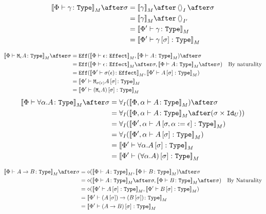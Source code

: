 \documentclass{report}
\begin{document}
\begin{align}
    \deno{\typerelation{\P}{\g}{\type}}\after\si &= \deno{\g}\after\term{I}\after\si\\
    & =  \deno{\g}\after\term{I'}\\
    & = \deno{\typerelation{\P'}{\g}{\type}}\\
    & = \deno{\typerelation{\P'}{\g\ssi}{\type}}
\end{align}

\begin{align}
    \deno{\typerelation{\P}{\mea}{\type}}\after\si & =  \Eff(\deno{\typerelation{\P}{\e}{\effect}}, \deno{\typerelation{\P}{A}{\type}})\after\si \\
    & = \Eff(\deno{\typerelation{\P}{\e}{\effect}}\after\si, \deno{\typerelation{\P}{A}{\type}}\after\si) \qt{By naturality}\\
    & = \Eff(\deno{\typerelation{\P'}{\si(\e)}{\effect}}, \deno{\typerelation{\P'}{A\ssi}{\type}})\\
    & = \deno{\typerelation{\P'}{\M{\si(\e)}{A\ssi}}{\type}}\\
    & = \deno{\typerelation{\P'}{(\mea)\ssi}{\type}}
\end{align}
    \begin{align}
        \deno{\typerelation{\P}{\all{\a}A}{\type}}\after\si & = \allI(\deno{\typerelation{\P,\a}{A}{\type}})\after\si\\
        & = \allI(\deno{\typerelation{\P,\a}{A}{\type}}\after(\si\times\Id{U}))\\
        & = \allI(\deno{\typerelation{\P',\a}{A\sub{\si, \a\setto\e}}{\type}})\\
        & = \allI(\deno{\typerelation{\P',\a}{A\ssi}{\type}})\\
        & = \deno{\typerelation{\P'}{\all{\a}{A\ssi}}{\type}}\\
        & = \deno{\typerelation{\P'}{(\all{\a}{A})\ssi}{\type}}\\
    \end{align}

\begin{align}
    \deno{\typerelation{\P}{\ab}{\type}}\after\si &= \diamond(\deno{\typerelation{\P}{A}{\type}},\deno{\typerelation{\P}{B}{\type}})\after\si\\
    &= \diamond(\deno{\typerelation{\P}{A}{\type}}\after\si,\deno{\typerelation{\P}{B}{\type}}\after\si)\qt{By Naturality}\\
    & = \diamond(\deno{\typerelation{\P'}{A\ssi}{\type}},\deno{\typerelation{\P'}{B\ssi}{\type}})\\
    & = \deno{\typerelation{\P'}{\fntype{(A\ssi)}{(B\ssi)}}{\type}}\\
    & = \deno{\typerelation{\P'}{(\ab)\ssi}{\type}}\\
\end{align}
\end{document}
